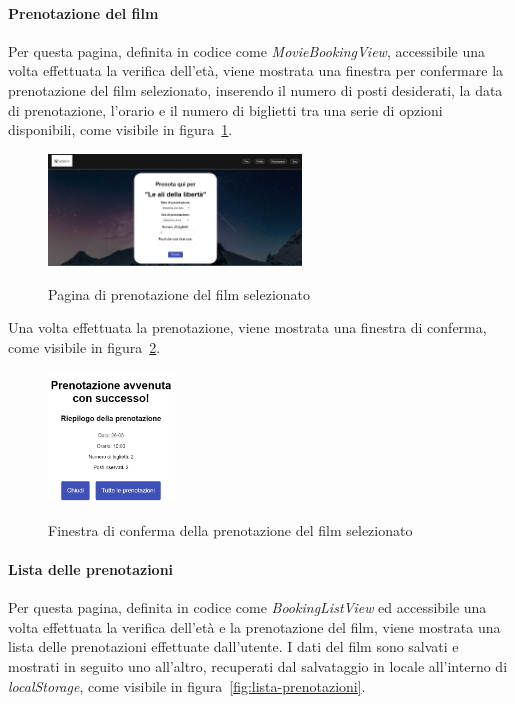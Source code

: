 \paragraph{Prenotazione del film}\label{sec:prenotazione-film}
Per questa pagina, definita in codice come \textit{MovieBookingView}, accessibile una volta effettuata la verifica dell'età, viene mostrata una finestra per confermare la prenotazione del film selezionato, 
inserendo il numero di posti desiderati, la data di prenotazione, l'orario e il numero di biglietti tra una serie di opzioni disponibili, come visibile in figura~\ref{fig:prenotazione-film}.

\begin{figure}[ht]
    \centering
    \includegraphics[width=0.6\textwidth, alt={Schermata della pagina di prenotazione del film selezionato}]{immagini/frontend/movie-booking.png}
    \caption{Pagina di prenotazione del film selezionato}\label{fig:prenotazione-film}
\end{figure}

\newpage

Una volta effettuata la prenotazione, viene mostrata una finestra di conferma, come visibile in figura~\ref{fig:conferma-prenotazione}.
\begin{figure}[ht]
    \centering
    \includegraphics[width=0.3\textwidth, alt={Schermata della pagina di conferma della prenotazione del film selezionato}]{immagini/frontend/movie-booking-done.png}
    \caption{Finestra di conferma della prenotazione del film selezionato}\label{fig:conferma-prenotazione}
\end{figure}

\paragraph{Lista delle prenotazioni}\label{par:lista-prenotazioni}
Per questa pagina, definita in codice come \textit{BookingListView} ed accessibile una volta effettuata la verifica dell'età e la prenotazione del film, viene mostrata una lista delle prenotazioni effettuate dall'utente.
I dati del film sono salvati e mostrati in seguito uno all'altro, recuperati dal salvataggio in locale all'interno di \textit{localStorage}, come visibile in figura~\ref{fig:lista-prenotazioni}.

